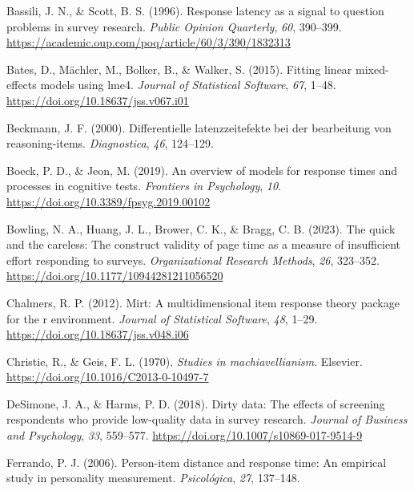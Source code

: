 \documentclass[
]{agujournal2019}
\newlength{\cslhangindent}
\newenvironment{CSLReferences}[2] %
 {\begin{list}{}{%
  \setlength{\itemindent}{0pt}
  \setlength{\leftmargin}{0pt}
  \setlength{\parsep}{0pt}
  \ifodd #1
   \setlength{\leftmargin}{\cslhangindent}
   \setlength{\itemindent}{-1\cslhangindent}
  \fi
  \setlength{\itemsep}{#2\baselineskip}}}
 {\end{list}}
\begin{document}
\begin{CSLReferences}{1}{0}
\vspace{1em}

Bassili, J. N., \& Scott, B. S. (1996). Response latency as a signal to
question problems in survey research. \emph{Public Opinion Quarterly},
\emph{60}, 390--399.
\url{https://academic.oup.com/poq/article/60/3/390/1832313}

Bates, D., Mächler, M., Bolker, B., \& Walker, S. (2015). Fitting linear
mixed-effects models using lme4. \emph{Journal of Statistical Software},
\emph{67}, 1--48. \url{https://doi.org/10.18637/jss.v067.i01}

Beckmann, J. F. (2000). Differentielle latenzzeitefekte bei der
bearbeitung von reasoning-items. \emph{Diagnostica}, \emph{46},
124--129.

Boeck, P. D., \& Jeon, M. (2019). An overview of models for response
times and processes in cognitive tests. \emph{Frontiers in Psychology},
\emph{10}. \url{https://doi.org/10.3389/fpsyg.2019.00102}

Bowling, N. A., Huang, J. L., Brower, C. K., \& Bragg, C. B. (2023). The
quick and the careless: The construct validity of page time as a measure
of insufficient effort responding to surveys. \emph{Organizational
Research Methods}, \emph{26}, 323--352.
\url{https://doi.org/10.1177/10944281211056520}

Chalmers, R. P. (2012). Mirt: A multidimensional item response theory
package for the r environment. \emph{Journal of Statistical Software},
\emph{48}, 1--29. \url{https://doi.org/10.18637/jss.v048.i06}

Christie, R., \& Geis, F. L. (1970). \emph{Studies in machiavellianism}.
Elsevier. \url{https://doi.org/10.1016/C2013-0-10497-7}

DeSimone, J. A., \& Harms, P. D. (2018). Dirty data: The effects of
screening respondents who provide low-quality data in survey research.
\emph{Journal of Business and Psychology}, \emph{33}, 559--577.
\url{https://doi.org/10.1007/s10869-017-9514-9}

Ferrando, P. J. (2006). Person-item distance and response time: An
empirical study in personality measurement. \emph{Psicológica},
\emph{27}, 137--148.


\end{CSLReferences}
\end{document}
